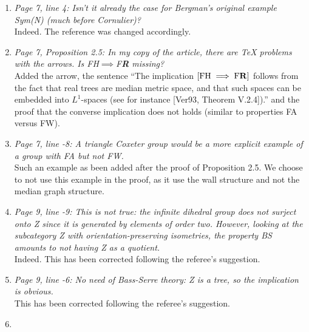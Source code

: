 \documentclass[english,a4paper]{article}
\newcommand*{\FH}{FH}
\newcommand*{\FW}{FW}
\newcommand*{\FA}{FA}
\newcommand*{\FR}{F\textbf{R}}
\begin{document}
\begin{enumerate}
%
\item\textit{Page 7, line 4: Isn’t it already the case for Bergman’s original example Sym(N) (much before Cornulier)?}\\
Indeed. The reference was changed accordingly.
%
\item\textit{Page 7, Proposition 2.5: In my copy of the article, there are TeX problems with the arrows. Is \FH$\implies$\FR{} missing?}\\
Added the arrow, the sentence ``The implication $[\textnormal{\FH}\implies \textnormal{\FR}]$ follows from the fact that real trees are median metric space, and that such spaces can be embedded into $L^1$-spaces (see for instance [Ver93, Theorem V.2.4]).'' and the proof that the converse implication does not holds (similar to properties \FA{} versus \FW).
%
\item\textit{Page 7, line -8: A triangle Coxeter group would be a more explicit example of a group with FA but not FW.}\\
Such an example as been added after the proof of Proposition 2.5. We choose to not use this example in the proof, as it use the wall structure and not the median graph structure.
%
\setcounter{enumi}{11}
\item\textit{Page 9, line -9: This is not true: the infinite dihedral group does not surject onto Z since it is generated by elements of order two. However, looking at the subcategory {Z} with orientation-preserving isometries, the property BS amounts to not having Z as a quotient.}\\
Indeed. This has been corrected following the referee's suggestion.
%
\item\textit{Page 9, line -6: No need of Bass-Serre theory: Z is a tree, so the implication is obvious.}\\
This has been corrected following the referee's suggestion.
%
\item\textit{}\\





\end{enumerate}
\end{document}
